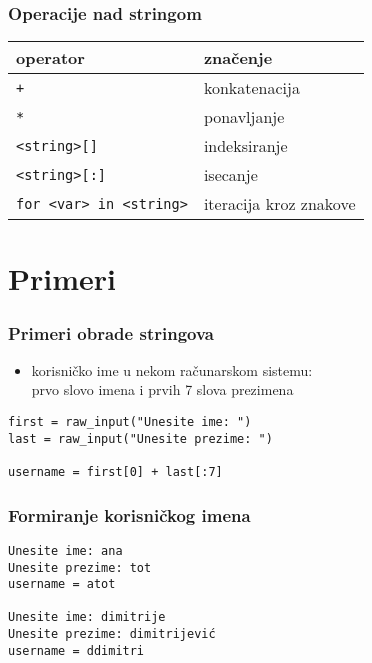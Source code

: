\documentclass[utf8,compress]{beamer}
\begin{document}
\begin{frame}[fragile]
  \frametitle{Operacije nad stringom}
\begin{center}
\begin{tabular}{l|l}
\textbf{operator} & \textbf{značenje} \\ \hline
\texttt{+} & konkatenacija \\
\texttt{*} & ponavljanje \\
\texttt{<string>[]} & indeksiranje \\
\texttt{<string>[:]} & isecanje \\
\texttt{for <var> in <string>} & iteracija kroz znakove
\end{tabular}
\end{center}
\end{frame}

\section{Primeri}

\begin{frame}[fragile]
  \frametitle{Primeri obrade stringova}
  \begin{itemize}
    \item korisničko ime u nekom računarskom sistemu: \\
      prvo slovo imena i prvih 7 slova prezimena
  \end{itemize}
\begin{verbatim}
first = raw_input("Unesite ime: ")
last = raw_input("Unesite prezime: ")

username = first[0] + last[:7]
\end{verbatim}
\end{frame}

\begin{frame}[fragile]
  \frametitle{Formiranje korisničkog imena}
\begin{verbatim}
Unesite ime: ana
Unesite prezime: tot
username = atot

Unesite ime: dimitrije
Unesite prezime: dimitrijević
username = ddimitri
\end{verbatim}
\end{frame}
\end{document}
